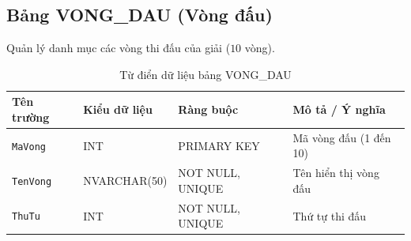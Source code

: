 \subsection{Bảng VONG\_DAU (Vòng đấu)}
Quản lý danh mục các vòng thi đấu của giải ($10$ vòng).
\begin{table}[H]
\centering
\small
\begin{tabular}{|l|l|l|p{6cm}|}
\hline
\textbf{Tên trường} & \textbf{Kiểu dữ liệu} & \textbf{Ràng buộc} & \textbf{Mô tả / Ý nghĩa} \\ \hline
\texttt{MaVong} & INT & PRIMARY KEY & Mã vòng đấu (1 đến 10) \\ \hline
\texttt{TenVong} & NVARCHAR(50) & NOT NULL, UNIQUE & Tên hiển thị vòng đấu \\ \hline
\texttt{ThuTu} & INT & NOT NULL, UNIQUE & Thứ tự thi đấu \\ \hline
\end{tabular}
\caption{Từ điển dữ liệu bảng VONG\_DAU}
\end{table}

